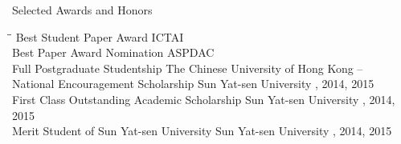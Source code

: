 
\begin{rSection}{Selected Awards and Honors}
\begin{tabbing}
\hspace{3.2in}\= \hspace{2.8in}\= \kill
    Best Student Paper Award                     \>ICTAI                            \\
    Best Paper Award Nomination                \>ASPDAC                            \\
    Full Postgraduate Studentship                \>The Chinese University of Hong Kong                       --      \\
    National Encouragement Scholarship      \> Sun Yat-sen University     , 2014, 2015 \\
    First Class Outstanding Academic Scholarship             \> Sun Yat-sen University     , 2014, 2015 \\
    Merit Student of Sun Yat-sen University                   \> Sun Yat-sen University     , 2014, 2015
\end{tabbing}
\end{rSection}

